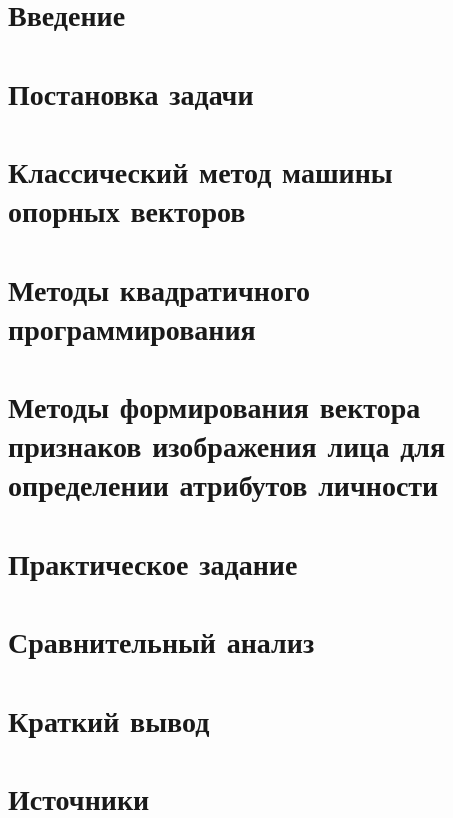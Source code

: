 \documentclass[main.tex]{subfiles}
\begin{document}
\section{Введение}

\section{Постановка задачи}



\section{Классический метод машины опорных векторов}

\section{Методы квадратичного программирования}

\section{Методы формирования вектора признаков изображения лица для определении атрибутов личности}

\section{Практическое задание}

\section{Сравнительный анализ}

\section{Краткий вывод}

\newpage
\section{Источники}

\end{document}
